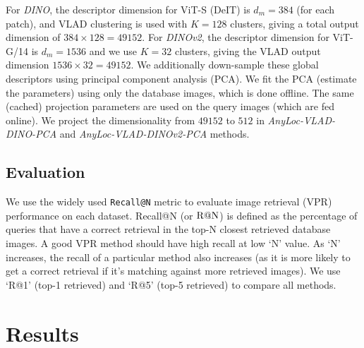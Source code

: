 For \emph{DINO}, the descriptor dimension for ViT-S (DeIT) is $d_m =
384$ (for each patch), and VLAD clustering is used with $K = 128$
clusters, giving a total output dimension of $384 \times 128 = 49152$.
For \emph{DINOv2}, the descriptor dimension for ViT-G/14 is $d_m =
1536$ and we use $K = 32$ clusters, giving the VLAD output dimension
$1536 \times 32 = 49152$. We additionally down-sample these global
descriptors using principal component analysis (PCA). We fit the PCA
(estimate the parameters) using only the database images, which is
done offline. The same (cached) projection parameters are used on the
query images (which are fed online). We project the dimensionality
from $49152$ to $512$ in \emph{AnyLoc-VLAD-DINO-PCA} and
\emph{AnyLoc-VLAD-DINOv2-PCA} methods.

\subsection{Evaluation}

We use the widely used \texttt{Recall@N} metric to evaluate image
retrieval (VPR) performance on each dataset. Recall@N (or
$\textup{R@N}$) is defined as the percentage of queries that have a
correct retrieval in the top-N closest retrieved database images. A
good VPR method should have high recall at low `N' value. As `N'
increases, the recall of a particular method also increases (as it is
more likely to get a correct retrieval if it's matching against more
retrieved images). We use `R@1' (top-1 retrieved) and `R@5' (top-5
retrieved) to compare all methods.

\section{Results}

